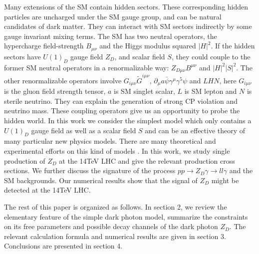 \documentclass{article}
\begin{document}
  Many extensions of the SM contain hidden sectors. These corresponding hidden particles are uncharged under the SM gauge group, and can be natural candidates of dark matter. They can interact with SM sectors indirectly by some gauge invariant mixing terms. The SM has two neutral operators, the hypercharge field-strength $B_{\mu\nu}$ and the Higgs modulus squared  $\left|H\right|^2$. If the hidden sectors have  $U(1)_D$  gauge field  $Z_D$, and  scalar field $S$, they could couple to the former SM neutral operators in a  renormalizable way: $Z_{D\mu\nu}B^{\mu\nu}$ and $\left|H\right|^2\left|S\right|^2$\cite{2U1}.  The other  renormalizable operators involve $G_{i\mu\nu}\tilde{G}^{i\mu\nu}$, $\partial_{\mu}a\bar{\psi}\gamma^{\mu}\gamma^5\psi$ and $LHN$\cite{1311.0029}, here $G_{i\mu\nu}$ is the gluon field strength tensor, $a$ is SM singlet scalar, $L$ is SM lepton and $N$ is sterile neutrino. They can explain the generation of strong CP violation and neutrino mass. These coupling operators give us an opportunity to probe the hidden world. In this work we consider the simplest model which only contains a  $U(1)_D$  gauge field as well as  a scalar field $S$ and can be an effective theory of many particular new physics models. There are many theoretical and experimental efforts on this kind of models \cite{2U1,1311.0029,0803.1243,accel-1,accel-2,accel-3,0801.3456,1405.5196,1405.7691,1408.1075,1312.4992,1603.01377, 1412.0018,0810.0714,1505.07645,0903.3941,exp,1209.6083}. In this work, we study  single production of  $Z_D$ at the 14TeV LHC and give the relevant production cross sections. We further discuss the signature of the process $pp\rightarrow Z_D\gamma\rightarrow ll\gamma$ and the SM  backgrounds. Our numerical results show that the signal of $Z_D$ might be detected at the 14TeV LHC.

  The rest of this paper is organized as follows. In section 2, we review the elementary feature of the simple dark photon model, summarize the constraints on its free parameters and possible decay channels  of the  dark photon $Z_D$. The relevant calculation formula and numerical results are given in section 3. Conclusions are presented in section 4.
\end{document}
